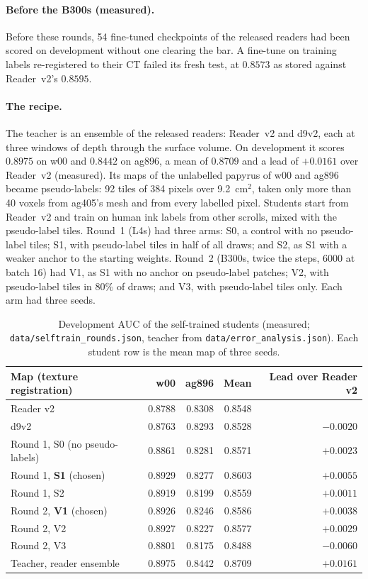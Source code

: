 \documentclass[11pt]{article}
\begin{document}
\paragraph{Before the B300s (measured).} Before these rounds, 54 fine-tuned checkpoints of the released readers had been scored on development without one clearing the bar. A fine-tune on training labels re-registered to their CT failed its fresh test, at $0.8573$ as stored against Reader~v2's $0.8595$.

\paragraph{The recipe.} The teacher is an ensemble of the released readers: Reader~v2 and d9v2, each at three windows of depth through the surface volume. On development it scores $0.8975$ on w00 and $0.8442$ on ag896, a mean of $0.8709$ and a lead of $+0.0161$ over Reader~v2 (measured). Its maps of the unlabelled papyrus of w00 and ag896 became pseudo-labels: 92 tiles of 384 pixels over 9.2~cm$^2$, taken only more than 40 voxels from ag405's mesh and from every labelled pixel. Students start from Reader~v2 and train on human ink labels from other scrolls, mixed with the pseudo-label tiles. Round~1 (L4s) had three arms: S0, a control with no pseudo-label tiles; S1, with pseudo-label tiles in half of all draws; and S2, as S1 with a weaker anchor to the starting weights. Round~2 (B300s, twice the steps, 6000 at batch 16) had V1, as S1 with no anchor on pseudo-label patches; V2, with pseudo-label tiles in $80\%$ of draws; and V3, with pseudo-label tiles only. Each arm had three seeds.

\begin{table}[ht]
\centering\small
\begin{tabular}{@{}lrrrr@{}}
\toprule
Map (texture registration) & w00 & ag896 & Mean & Lead over Reader v2 \\
\midrule
Reader v2 & 0.8788 & 0.8308 & 0.8548 & \\
d9v2 & 0.8763 & 0.8293 & 0.8528 & $-0.0020$ \\
Round 1, S0 (no pseudo-labels) & 0.8861 & 0.8281 & 0.8571 & $+0.0023$ \\
Round 1, \textbf{S1} (chosen) & 0.8929 & 0.8277 & 0.8603 & $\mathbf{+0.0055}$ \\
Round 1, S2 & 0.8919 & 0.8199 & 0.8559 & $+0.0011$ \\
Round 2, \textbf{V1} (chosen) & 0.8926 & 0.8246 & 0.8586 & $\mathbf{+0.0038}$ \\
Round 2, V2 & 0.8927 & 0.8227 & 0.8577 & $+0.0029$ \\
Round 2, V3 & 0.8801 & 0.8175 & 0.8488 & $-0.0060$ \\
Teacher, reader ensemble & 0.8975 & 0.8442 & 0.8709 & $+0.0161$ \\
\bottomrule
\end{tabular}
\caption{Development AUC of the self-trained students (measured; \texttt{data/selftrain\_rounds.json}, teacher from \texttt{data/error\_analysis.json}). Each student row is the mean map of three seeds.}
\label{tab:rounds}
\end{table}
\end{document}
